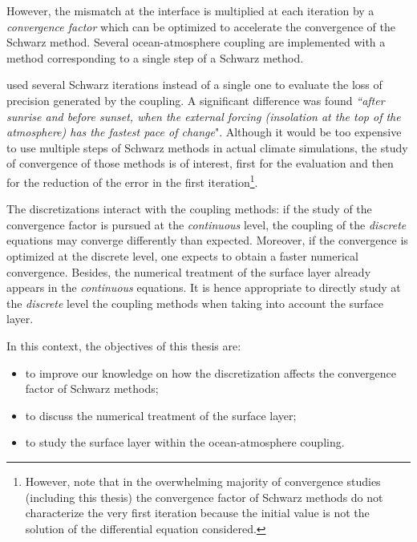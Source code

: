However, the mismatch at the interface is multiplied
at each iteration by a \textit{convergence factor} which
can be optimized to accelerate the convergence of the
Schwarz method.
Several ocean-atmosphere coupling are implemented with
a method corresponding to a single step of a Schwarz method.
\par %
\citep{marti_schwarz_2021} used several Schwarz iterations
instead of a single one to evaluate the loss of precision
generated by the coupling. A significant difference was found
\textit{``after sunrise
and before sunset, when the external forcing (insolation at
the top of the atmosphere) has the fastest pace of change}".
Although it would be too expensive to use multiple
steps of Schwarz methods in actual climate simulations,
the study of convergence of those methods is of interest,
first for the evaluation and then for the reduction of the
error in the first iteration\footnote{However, note that
in the overwhelming majority of convergence studies
(including this thesis) the convergence factor of
Schwarz methods do not characterize the very first iteration
because the initial value is not the solution of the
differential equation considered.}.
\par %
The discretizations interact with the coupling methods:
if the study of the convergence factor is pursued at the
\textit{continuous} level, the coupling of the \textit{discrete}
equations may converge differently than expected. Moreover,
if the convergence is optimized at the discrete level, one expects
to obtain a faster numerical convergence.
Besides, the numerical treatment of the surface layer already
appears in the \textit{continuous} equations.
It is hence appropriate to directly study at the \textit{discrete}
level the coupling methods when taking into account
the surface layer.
\par %
In this context, the objectives of this thesis are:
\begin{itemize}
\item to improve our knowledge on how the discretization affects
the convergence factor of Schwarz methods;
\item to discuss the numerical treatment of the surface layer;
\item to study the surface layer within the ocean-atmosphere coupling.
\end{itemize}
